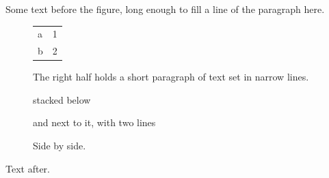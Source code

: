 \documentclass{article}
\begin{document}
Some text before the figure, long enough to fill a line of the paragraph here.

\begin{figure}[h]
\centering
\begin{minipage}{0.45\linewidth}
\centering
\begin{tabular}{lr}
a & 1 \\
b & 2
\end{tabular}
\end{minipage}\hfill
\begin{minipage}{0.45\linewidth}
The right half holds a short paragraph of text set in narrow lines.
\end{minipage}

\begin{minipage}[t]{3cm}
stacked below
\end{minipage}\quad
\begin{minipage}[t]{3cm}
and next to it, with two lines
\end{minipage}
\caption{Side by side.}
\end{figure}

Text after.
\end{document}
